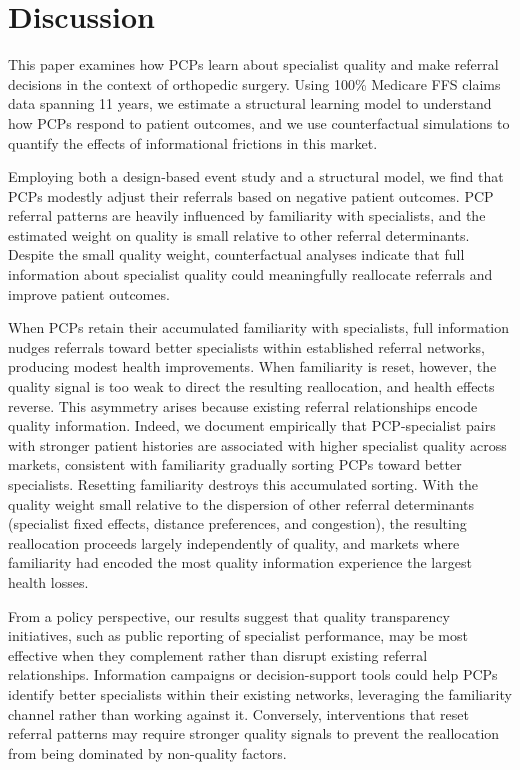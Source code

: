 \documentclass[12pt]{article}
\begin{document}

\section{Discussion}
\label{sec:discuss}

This paper examines how PCPs learn about specialist quality and make referral decisions in the context of orthopedic surgery. Using 100\% Medicare FFS claims data spanning 11 years, we estimate a structural learning model to understand how PCPs respond to patient outcomes, and we use counterfactual simulations to quantify the effects of informational frictions in this market.

Employing both a design-based event study and a structural model, we find that PCPs modestly adjust their referrals based on negative patient outcomes. PCP referral patterns are heavily influenced by familiarity with specialists, and the estimated weight on quality is small relative to other referral determinants. Despite the small quality weight, counterfactual analyses indicate that full information about specialist quality could meaningfully reallocate referrals and improve patient outcomes. 

When PCPs retain their accumulated familiarity with specialists, full information nudges referrals toward better specialists within established referral networks, producing modest health improvements. When familiarity is reset, however, the quality signal is too weak to direct the resulting reallocation, and health effects reverse. This asymmetry arises because existing referral relationships encode quality information. Indeed, we document empirically that PCP-specialist pairs with stronger patient histories are associated with higher specialist quality across markets, consistent with familiarity gradually sorting PCPs toward better specialists. Resetting familiarity destroys this accumulated sorting. With the quality weight small relative to the dispersion of other referral determinants (specialist fixed effects, distance preferences, and congestion), the resulting reallocation proceeds largely independently of quality, and markets where familiarity had encoded the most quality information experience the largest health losses.

From a policy perspective, our results suggest that quality transparency initiatives, such as public reporting of specialist performance, may be most effective when they complement rather than disrupt existing referral relationships. Information campaigns or decision-support tools could help PCPs identify better specialists within their existing networks, leveraging the familiarity channel rather than working against it. Conversely, interventions that reset referral patterns may require stronger quality signals to prevent the reallocation from being dominated by non-quality factors.
\end{document}
